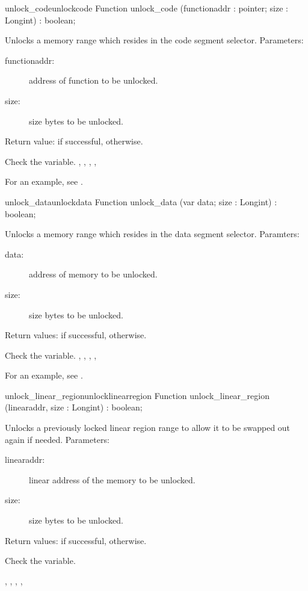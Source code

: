 \begin{functionl}{unlock\_code}{unlockcode}
\Declaration
Function unlock\_code (functionaddr : pointer; size : Longint) : boolean;

\Description
Unlocks a memory range which resides in the code segment selector.
Parameters:
\begin{description}
\item[functionaddr:\ ] address of function to be unlocked. 
\item[size:\ ] size bytes to be unlocked.
\end{description}
Return value:  if successful,  otherwise.

\Errors
 Check the  variable.
\SeeAlso
{},
 ,
,
,
\end{functionl}
For an example, see .
\begin{functionl}{unlock\_data}{unlockdata}
\Declaration
Function unlock\_data (var data; size : Longint) : boolean;

\Description
Unlocks a memory range which resides in the data segment selector.
Paramters:
\begin{description}
\item[data:\ ] address of memory to be unlocked. 
\item[size:\ ] size bytes to be unlocked.
\end{description}
Return values:  if successful,  otherwise.

\Errors
 Check the  variable.
\SeeAlso
{},
,
,
,
\end{functionl}
For an example, see .
\begin{functionl}{unlock\_linear\_region}{unlocklinearregion}
\Declaration
Function unlock\_linear\_region (linearaddr, size : Longint) : boolean;

\Description
Unlocks a previously locked linear region range to allow it to be swapped
out again if needed.
Parameters:
\begin{description}
\item[linearaddr:\ ] linear address of the memory to be unlocked. 
\item[size:\ ] size bytes to be unlocked.
\end{description}
Return values:  if successful,  otherwise.

\Errors
 Check the  variable.
\SeeAlso

,
,
,
,
\end{functionl}

